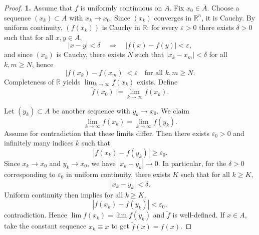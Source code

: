 \documentclass[12pt]{article}
\renewcommand{\(}{\left(}%
\renewcommand{\)}{\right)}%
\renewcommand{\[}{\left[}%
\renewcommand{\]}{\right]}%
\newtheorem{proof}{Proof.}}
\begin{document}
\begin{proof}
\textbf{1.}
Assume that $f$ is uniformly continuous on $A$.
Fix $x_0 \in \overline{A}$. Choose a sequence $(x_k)\subset A$ with $x_k\to x_0$.
Since $(x_k)$ converges in $\mathbb{R}^n$, it is Cauchy. By uniform continuity, $(f(x_k))$ is Cauchy in $\mathbb{R}$:
for every $\varepsilon>0$ there exists $\delta>0$ such that for all $x,y\in A$,
\begin{equation*}
|x-y|<\delta \quad \Rightarrow \quad |f(x)-f(y)|<\varepsilon,
\end{equation*}
and since $(x_k)$ is Cauchy, there exists $N$ such that $|x_k-x_m|<\delta$ for all $k,m\ge N$, hence
\begin{equation*}
|f(x_k)-f(x_m)|<\varepsilon \quad \text{for all } k,m\ge N.
\end{equation*}
Completeness of $\mathbb{R}$ yields $\lim_{k\to\infty} f(x_k)$ exists. Define
\begin{equation*}
\tilde f(x_0):=\lim_{k\to\infty} f(x_k).
\end{equation*}


Let $(y_k)\subset A$ be another sequence with $y_k\to x_0$.
We claim
\begin{equation*}
\lim_{k\to\infty} f(x_k)=\lim_{k\to\infty} f(y_k).
\end{equation*}
Assume for contradiction that these limits differ. Then there exists $\varepsilon_0>0$ and infinitely many indices $k$ such that
\begin{equation*}
|f(x_k)-f(y_k)|\ge \varepsilon_0.
\end{equation*}
Since $x_k\to x_0$ and $y_k\to x_0$, we have $|x_k-y_k|\to 0$. In particular, for the $\delta>0$ corresponding to
$\varepsilon_0$ in uniform continuity, there exists $K$ such that for all $k\ge K$,
\begin{equation*}
|x_k-y_k|<\delta.
\end{equation*}
Uniform continuity then implies for all $k\ge K$,
\begin{equation*}
|f(x_k)-f(y_k)|<\varepsilon_0,
\end{equation*}
contradiction. Hence $\lim f(x_k)=\lim f(y_k)$ and $\tilde f$ is well-defined.
If $x\in A$, take the constant sequence $x_k\equiv x$ to get $\tilde f(x)=f(x)$.



\end{proof}
\end{document}

